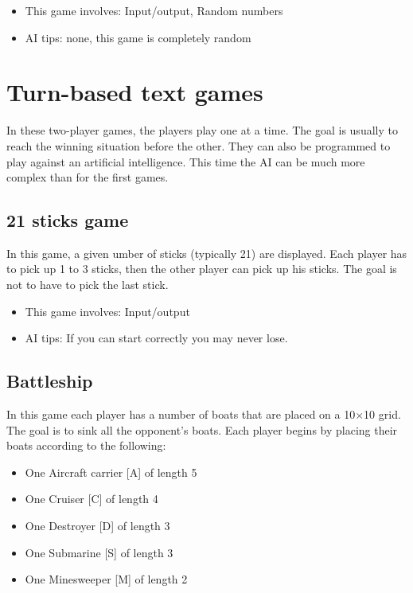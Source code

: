 \documentclass{ecnreport}
\begin{document}
\begin{itemize}
 \item This game involves: Input/output, Random numbers
  \item AI tips: none, this game is completely random
\end{itemize}

\section{Turn-based text games}

In these two-player games, the players play one at a time. The goal is usually to reach the winning situation before the other.
They can also be programmed to play against an artificial intelligence. This time the AI can be much more complex than for the first games.

\subsection{21 sticks game}

In this game, a given umber of sticks (typically 21) are displayed.
Each player has to pick up 1 to 3 sticks, then the other player can pick up his sticks.
The goal is not to have to pick the last stick.

\begin{itemize}
 \item This game involves: Input/output
 \item AI tips: If you can start correctly you may never lose.
\end{itemize}

\subsection{Battleship}

In this game each player has a number of boats that are placed on a 10$\times$10 grid. The goal is to sink all the opponent's boats.
Each player begins by placing their boats according to the following:
\begin{itemize}
 \item One Aircraft carrier [A] of length 5
 \item One Cruiser [C] of length 4
 \item One Destroyer [D] of length 3
 \item One Submarine [S] of length 3
 \item One Minesweeper [M] of length 2
\end{itemize}
\end{document}
